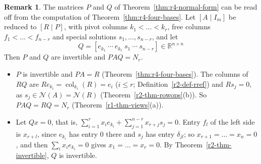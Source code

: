 \documentclass[12pt]{article}
\newcommand{\R}{\mathbb R}
\DeclareMathOperator{\col}{col}
\theoremstyle{definition}
\newtheorem{remark}[theorem]{Remark}
\begin{document}
\begin{remark}\label{rem:r4-normal-form}
The matrices \(P\) and \(Q\) of Theorem~\ref{thm:r4-normal-form} can be read off from the computation of
Theorem~\ref{thm:r4-four-bases}. Let \([A\mid I_m]\) be reduced to \([R\mid P]\), with pivot columns
\(k_1<\dots<k_r\), free columns \(f_1<\dots<f_{n-r}\) and special solutions \(s_1,\dots,s_{n-r}\), and let
\[
Q=[e_{k_1}\ \cdots\ e_{k_r}\ s_1\ \cdots\ s_{n-r}]\in\R^{n\times n}
\]
Then \(P\) and \(Q\) are invertible and \(PAQ=N_r\).
\begin{itemize}
\item \(P\) is invertible and \(PA=R\) (Theorem~\ref{thm:r4-four-bases}). The columns of \(RQ\) are
\(Re_{k_i}=\col_{k_i}(R)=e_i\) (\(i\leqslant r\); Definition~\ref{r2-def-rref}) and \(Rs_j=0\), as
\(s_j\in\mathcal N(A)=\mathcal N(R)\) (Theorem~\ref{r2-thm-rowops}(b)). So \(PAQ=RQ=N_r\)
(Theorem~\ref{r1-thm-views}(a)).
\item Let \(Qx=0\), that is, \(\sum_{i=1}^rx_ie_{k_i}+\sum_{j=1}^{n-r}x_{r+j}s_j=0\). Entry \(f_l\) of the left side is
\(x_{r+l}\), since \(e_{k_i}\) has entry \(0\) there and \(s_j\) has entry \(\delta_{jl}\); so
\(x_{r+1}=\dots=x_n=0\), and then \(\sum_ix_ie_{k_i}=0\) gives \(x_1=\dots=x_r=0\). By
Theorem~\ref{r2-thm-invertible}, \(Q\) is invertible.
\end{itemize}
\end{remark}
\end{document}
